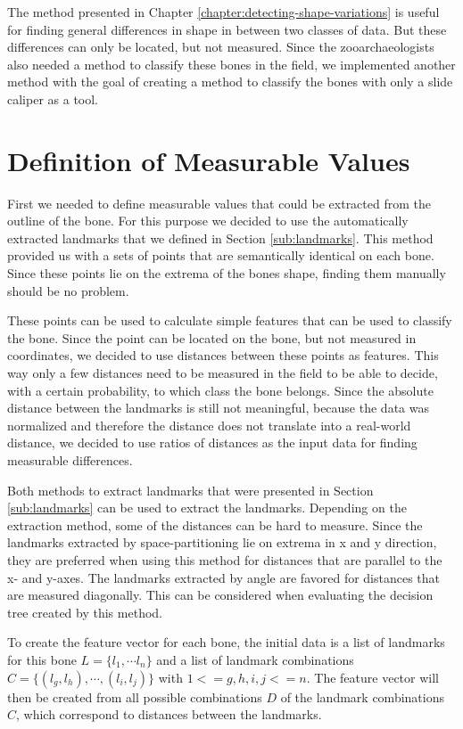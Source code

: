 \documentclass[pdftex,12pt,a4paper]{report}
\begin{document}
The method presented in Chapter \ref{chapter:detecting-shape-variations} is useful for finding general differences in shape in between two classes of data. But these differences can only be located, but not measured. Since the zooarchaeologists also needed a method to classify these bones in the field, we implemented another method with the goal of creating a method to classify the bones with only a slide caliper as a tool.

\section{Definition of Measurable Values}

First we needed to define measurable values that could be extracted from the outline of the bone. For this purpose we decided to use the automatically extracted landmarks that we defined in Section \ref{sub:landmarks}. This method provided us with a sets of points that are semantically identical on each bone. Since these points lie on the extrema of the bones shape, finding them manually should be no problem.

These points can be used to calculate simple features that can be used to classify the bone. Since the point can be located on the bone, but not measured in coordinates, we decided to use distances between these points as features. This way only a few distances need to be measured in the field to be able to decide, with a certain probability, to which class the bone belongs. Since the absolute distance between the landmarks is still not meaningful, because the data was normalized and therefore the distance does not translate into a real-world distance, we decided to use ratios of distances as the input data for finding measurable differences.

Both methods to extract landmarks that were presented in Section \ref{sub:landmarks} can be used to extract the landmarks. Depending on the extraction method, some of the distances can be hard to measure. Since the landmarks extracted by space-partitioning lie on extrema in x and y direction, they are preferred when using this method for distances that are parallel to the x- and y-axes. The landmarks extracted by angle are favored for distances that are measured diagonally. This can be considered when evaluating the decision tree created by this method.

To create the feature vector for each bone, the initial data is a list of landmarks for this bone $L = \{ l_1, \cdots l_n \}$ and a list of landmark combinations $C = \{ (l_g, l_h), \cdots, (l_i, l_j) \}$ with $1 <= g,h,i,j <= n$. The feature vector will then be created from all possible combinations $D$ of the landmark combinations $C$, which correspond to distances between the landmarks.
\end{document}
